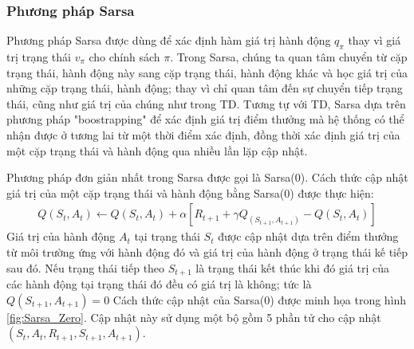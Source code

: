 \subsubsection{Phương pháp Sarsa}
Phương pháp Sarsa được dùng để xác định hàm giá trị hành động $q_{\pi}$ thay vì giá trị trạng thái $v_{\pi}$ cho chính sách $\pi$. Trong Sarsa, chúng ta quan tâm chuyển từ cặp trạng thái, hành động này sang cặp trạng thái, hành động khác và học giá trị của những cặp trạng thái, hành động; thay vì chỉ quan tâm đến sự chuyển tiếp trạng thái, cũng như giá trị của chúng như trong TD. Tương tự với TD, Sarsa dựa trên phương pháp "boostrapping" để xác định giá trị điểm thưởng mà hệ thống có thể nhận được ở tương lai từ một thời điểm xác định, đồng thời xác định giá trị của một cặp trạng thái và hành động qua nhiều lần lặp cập nhật.

Phương pháp đơn giản nhất trong Sarsa được gọi là Sarsa(0). Cách thức cập nhật giá trị của một cặp trạng thái và hành động bằng Sarsa(0) được thực hiện:
\begin{align}
Q(\mathit{S}_t, \mathit{A}_t) \leftarrow Q(\mathit{S}_t, \mathit{A}_t) + \alpha \left[\mathit{R}_{t+1} + \gamma Q_(\mathit{S}_{t+1}, \mathit{A}_{t+1}) -  Q(\mathit{S}_t, \mathit{A}_t) \right]
\label{eq:Sarsa_action_update}
\end{align}
Giá trị của hành động $\mathit{A}_t$ tại trạng thái $\mathit{S}_t$ được cập nhật dựa trên điểm thưởng từ môi trường ứng với hành động đó và giá trị của hành động ở trạng thái kế tiếp sau đó. Nếu trạng thái tiếp theo $\mathit{S}_{t+1}$ là trạng thái kết thúc khi đó giá trị của các hành động tại trạng thái đó đều có giá trị là không; tức là $Q(\mathit{S}_{t+1}, \mathit{A}_{t+1}) = 0$
Cách thức cập nhật của Sarsa(0) được minh họa trong hình \ref{fig:Sarsa_Zero}.
Cập nhật này sử dụng một bộ gồm 5 phần tử cho cập nhật $(\mathit{S}_t, \mathit{A}_t, \mathit{R}_{t+1}, \mathit{S}_{t+1}, \mathit{A}_{t+1})$.

